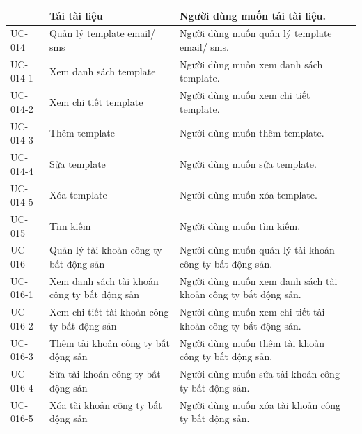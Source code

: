 \documentclass[12pt,a4paper]{article}
\begin{document}
\begin{center}
\begin{longtable}{|p{2.5cm}|p{4.5cm}|p{7.5cm}|c|}
            & Tải tài liệu
            & Người dùng muốn tải tài liệu.
            \\ \hline
            UC-014
            & Quản lý template email/ sms
            & Người dùng muốn quản lý template email/ sms.
            \\ \hline
            UC-014-1
            & Xem danh sách template
            & Người dùng muốn xem danh sách template.
            \\ \hline
            UC-014-2
            & Xem chi tiết template
            & Người dùng muốn xem chi tiết template.
            \\ \hline
            UC-014-3
            & Thêm template
            & Người dùng muốn thêm template.
            \\ \hline
            UC-014-4
            & Sửa template
            & Người dùng muốn sửa template.
            \\ \hline
            UC-014-5
            & Xóa template
            & Người dùng muốn xóa template.
            \\ \hline
            UC-015
            & Tìm kiếm
            & Người dùng muốn tìm kiếm.
            \\ \hline
            UC-016
            & Quản lý tài khoản công ty bất động sản
            & Người dùng muốn quản lý tài khoản công ty bất động sản.
            \\ \hline
            UC-016-1
            & Xem danh sách tài khoản công ty bất động sản
            & Người dùng muốn xem danh sách tài khoản công ty bất động sản.
            \\ \hline
            UC-016-2
            & Xem chi tiết tài khoản công ty bất động sản
            & Người dùng muốn xem chi tiết tài khoản công ty bất động sản.
            \\ \hline
            UC-016-3
            & Thêm tài khoản công ty bất động sản
            & Người dùng muốn thêm tài khoản công ty bất động sản.
            \\ \hline
            UC-016-4
            & Sửa tài khoản công ty bất động sản
            & Người dùng muốn sửa tài khoản công ty bất động sản.
            \\ \hline
            UC-016-5
            & Xóa tài khoản công ty bất động sản
            & Người dùng muốn xóa tài khoản công ty bất động sản.
            \\ \hline

\end{longtable}
\end{center}
\end{document}
